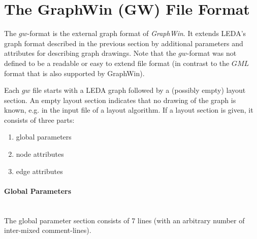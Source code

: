 \section{The GraphWin (GW) File Format}

The $gw$-format is the external graph format of {\em GraphWin}.
It extends LEDA's graph format described in the previous section 
by additional parameters and attributes for describing graph drawings.
Note that the $gw$-format was not defined to be a readable or
easy to extend file format (in contrast to the $GML$ format
that is also supported by GraphWin).

Each $gw$ file starts with a LEDA graph followed by a 
(possibly empty) layout section. An empty layout section indicates
that no drawing of the graph is known, e.g. in the input file
of a layout algorithm. If a layout section is given, it consists of 
three parts:
\begin{enumerate}
\item global parameters  
\item node attributes
\item edge attributes
\end{enumerate}


\paragraph{Global Parameters}\ \\

The global parameter section consists of 7 lines (with an arbitrary
number of inter-mixed comment-lines).

